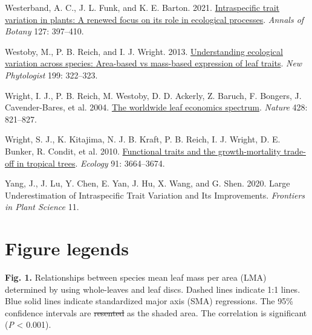 \documentclass[
  12pt,
  a4paper,
,tablecaptionabove
]{scrartcl}
\newlength{\cslhangindent}
\newenvironment{CSLReferences}[2] %
 {%
  \setlength{\parindent}{0pt}
  \ifodd #1 \everypar{\setlength{\hangindent}{\cslhangindent}}\ignorespaces\fi
  \ifnum #2 > 0
  \setlength{\parskip}{#2\baselineskip}
  \fi
 }%
 {}
\providecommand{\DIFaddtex}[1]{{\protect\color{blue}\uwave{#1}}} %
\providecommand{\DIFdeltex}[1]{{\protect\color{red}\sout{#1}}}                      %
\providecommand{\DIFaddbegin}{} %
\providecommand{\DIFaddend}{} %
\providecommand{\DIFdelbegin}{} %
\providecommand{\DIFdelend}{} %
\providecommand{\DIFadd}[1]{\texorpdfstring{\DIFaddtex{#1}}{#1}} %
\providecommand{\DIFdel}[1]{\texorpdfstring{\DIFdeltex{#1}}{}} %
\begin{document}
\begin{CSLReferences}{1}{0}
\leavevmode{}%
Westerband, A. C., J. L. Funk, and K. E. Barton. 2021. \href{https://doi.org/10.1093/aob/mcab011}{Intraspecific trait variation in plants: A renewed focus on its role in ecological processes}. \emph{Annals of Botany} 127: 397--410.

\leavevmode{}%
Westoby, M., P. B. Reich, and I. J. Wright. 2013. \href{https://doi.org/10.1111/nph.12345}{Understanding ecological variation across species: {Area-based} vs mass-based expression of leaf traits}. \emph{New Phytologist} 199: 322--323.

\leavevmode{}%
Wright, I. J., P. B. Reich, M. Westoby, D. D. Ackerly, Z. Baruch, F. Bongers, J. Cavender-Bares, et al. 2004. \href{https://doi.org/10.1038/nature02403}{The worldwide leaf economics spectrum}. \emph{Nature} 428: 821--827.

\leavevmode{}%
Wright, S. J., K. Kitajima, N. J. B. Kraft, P. B. Reich, I. J. Wright, D. E. Bunker, R. Condit, et al. 2010. \href{https://doi.org/10.1890/09-2335.1}{Functional traits and the growth-mortality trade-off in tropical trees}. \emph{Ecology} 91: 3664--3674.

\leavevmode{}%
Yang, J., J. Lu, Y. Chen, E. Yan, J. Hu, X. Wang, and G. Shen. 2020. Large {Underestimation} of {Intraspecific Trait Variation} and {Its Improvements}. \emph{Frontiers in Plant Science} 11.

\end{CSLReferences}

\newpage

\DIFaddbegin \newpage

\hypertarget{figure-legends}{%
\section{Figure legends}\label{figure-legends}}

\DIFaddend \textbf{Fig. 1.}
Relationships between species mean leaf mass per area (LMA) determined by using whole-leaves and leaf discs.
Dashed lines indicate 1:1 lines.
Blue solid lines indicate standardized major axis (SMA) regressions.
The 95\% confidence intervals are \DIFdelbegin \DIFdel{resented }\DIFdelend \DIFaddbegin \DIFadd{represented }\DIFaddend as the shaded area.
The correlation is significant (\emph{P} \textless{} 0.001).
\end{document}
